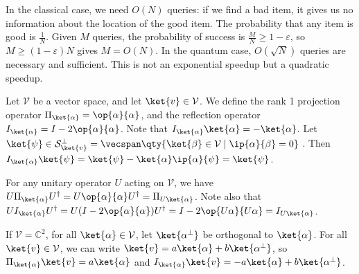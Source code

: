 In the classical case, we need $O(N)$ queries: if we find a bad item, it gives us no information about the location of the good item.
The probability that any item is good is $\frac{1}{N}$.
Given $M$ queries, the probability of success is $\frac{M}{N} \geq 1 - \varepsilon$, so $M \geq (1-\varepsilon)N$ gives $M = O(N)$.
In the quantum case, $O(\sqrt{N})$ queries are necessary and sufficient.
This is not an exponential speedup but a quadratic speedup.

Let $\mathcal V$ be a vector space, and let $\ket{v} \in \mathcal V$.
We define the rank 1 projection operator $\Pi_{\ket{\alpha}} = \op{\alpha}{\alpha}$, and the reflection operator $I_{\ket{\alpha}} = I - 2 \op{\alpha}{\alpha}$.
Note that $I_{\ket{\alpha}} \ket{\alpha} = - \ket{\alpha}$.
Let $\ket{\psi} \in \mathcal S_{\ket{v}}^\perp = \vecspan\qty{\ket{\beta} \in \mathcal V \mid \ip{\alpha}{\beta} = 0}$ .
Then $I_{\ket{\alpha}} \ket{\psi} = \ket{\psi} - \ket{\alpha}\ip{\alpha}{\psi} = \ket{\psi}$.

For any unitary operator $U$ acting on $\mathcal V$, we have $U \Pi_{\ket{\alpha}} U^\dagger = U \op{\alpha}{\alpha} U^\dagger = \Pi_{U\ket{\alpha}}$.
Note also that $U I_{\ket{\alpha}} U^\dagger = U(I - 2 \op{\alpha}{\alpha}) U^\dagger = I - 2 \op{U\alpha}{U\alpha} = I_{U\ket{\alpha}}$.

If $\mathcal V = \mathbb C^2$, for all $\ket{\alpha} \in \mathcal V$, let $\ket{\alpha^\perp}$ be orthogonal to $\ket{\alpha}$.
For all $\ket{v} \in \mathcal V$, we can write $\ket{v} = a \ket{\alpha} + b \ket{\alpha^\perp}$, so $\Pi_{\ket{\alpha}} \ket{v} = a \ket{\alpha}$ and $I_{\ket{\alpha}} \ket{v} = -a\ket{\alpha} + b \ket{\alpha^\perp}$.

